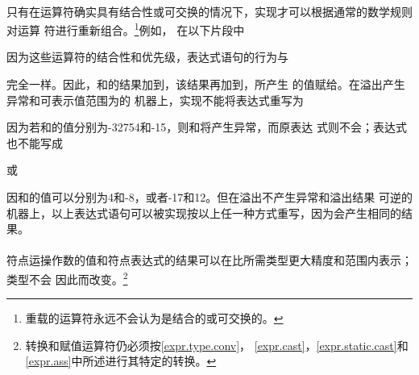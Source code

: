\paragraph{} %
\begin{note}
  只有在运算符确实具有结合性或可交换的情况下，实现才可以根据通常的数学规则对运算
  符进行重新组合。\footnote{重载的运算符永远不会认为是结合的或可交换的。}例如，
  在以下片段中
  \begin{codeenv}
  \end{codeenv}
  因为这些运算符的结合性和优先级，表达式语句的行为与
  \begin{codeenv}
  \end{codeenv}
  完全一样。因此，和的结果加到，该结果再加到，所产生
  的值赋给。在溢出产生异常和可表示值范围为\tm{[-32768, +32767]}的
  机器上，实现不能将表达式重写为
  \begin{codeenv}
  \end{codeenv}
  因为若和的值分别为-32754和-15，则和将产生异常，而原表达
  式则不会；表达式也不能写成
  \begin{codeenv}
  \end{codeenv}
  或
  \begin{codeenv}
  \end{codeenv}
  因和的值可以分别为4和-8，或者-17和12。但在溢出不产生异常和溢出结果
  可逆的机器上，以上表达式语句可以被实现按以上任一种方式重写，因为会产生相同的结
  果。
\end{note}

\paragraph{} %
符点运操作数的值和符点表达式的结果可以在比所需类型更大精度和范围内表示；类型不会
因此而改变。\footnote{转换和赋值运算符仍必须按\ref{expr.type.conv}，
\ref{expr.cast}，\ref{expr.static.cast}和\ref{expr.ass}中所述进行其特定的转换。}
